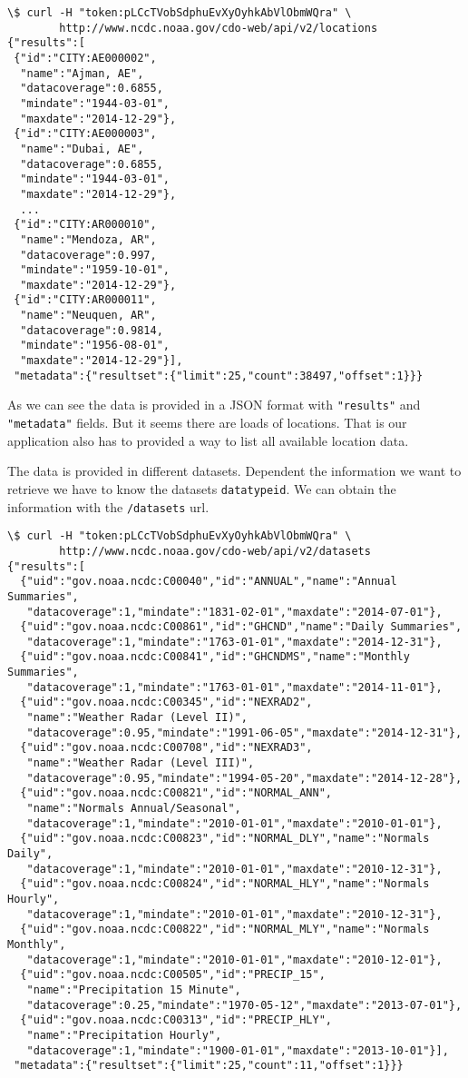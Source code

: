 \documentclass[10pt, a4paper]{article}
\begin{document}
\begin{verbatim}
\$ curl -H "token:pLCcTVobSdphuEvXyOyhkAbVlObmWQra" \
        http://www.ncdc.noaa.gov/cdo-web/api/v2/locations
{"results":[
 {"id":"CITY:AE000002",
  "name":"Ajman, AE",
  "datacoverage":0.6855,
  "mindate":"1944-03-01",
  "maxdate":"2014-12-29"},
 {"id":"CITY:AE000003",
  "name":"Dubai, AE",
  "datacoverage":0.6855,
  "mindate":"1944-03-01",
  "maxdate":"2014-12-29"},
  ...
 {"id":"CITY:AR000010",
  "name":"Mendoza, AR",
  "datacoverage":0.997,
  "mindate":"1959-10-01",
  "maxdate":"2014-12-29"},
 {"id":"CITY:AR000011",
  "name":"Neuquen, AR",
  "datacoverage":0.9814,
  "mindate":"1956-08-01",
  "maxdate":"2014-12-29"}],
 "metadata":{"resultset":{"limit":25,"count":38497,"offset":1}}}
\end{verbatim}

As we can see the data is provided in a JSON format with \texttt{"results"} and
\texttt{"metadata"} fields. But it seems there are loads of locations. That is
our application also has to provided a way to list all available location data.

The data is provided in different datasets. Dependent the information we want
to retrieve we have to know the datasets \texttt{datatypeid}. We can obtain the
information with the \texttt{/datasets} url.

\begin{verbatim}
\$ curl -H "token:pLCcTVobSdphuEvXyOyhkAbVlObmWQra" \
        http://www.ncdc.noaa.gov/cdo-web/api/v2/datasets
{"results":[
  {"uid":"gov.noaa.ncdc:C00040","id":"ANNUAL","name":"Annual Summaries",
   "datacoverage":1,"mindate":"1831-02-01","maxdate":"2014-07-01"},
  {"uid":"gov.noaa.ncdc:C00861","id":"GHCND","name":"Daily Summaries",
   "datacoverage":1,"mindate":"1763-01-01","maxdate":"2014-12-31"},
  {"uid":"gov.noaa.ncdc:C00841","id":"GHCNDMS","name":"Monthly Summaries",
   "datacoverage":1,"mindate":"1763-01-01","maxdate":"2014-11-01"},
  {"uid":"gov.noaa.ncdc:C00345","id":"NEXRAD2",
   "name":"Weather Radar (Level II)",
   "datacoverage":0.95,"mindate":"1991-06-05","maxdate":"2014-12-31"},
  {"uid":"gov.noaa.ncdc:C00708","id":"NEXRAD3",
   "name":"Weather Radar (Level III)",
   "datacoverage":0.95,"mindate":"1994-05-20","maxdate":"2014-12-28"},
  {"uid":"gov.noaa.ncdc:C00821","id":"NORMAL_ANN",
   "name":"Normals Annual/Seasonal",
   "datacoverage":1,"mindate":"2010-01-01","maxdate":"2010-01-01"},
  {"uid":"gov.noaa.ncdc:C00823","id":"NORMAL_DLY","name":"Normals Daily",
   "datacoverage":1,"mindate":"2010-01-01","maxdate":"2010-12-31"},
  {"uid":"gov.noaa.ncdc:C00824","id":"NORMAL_HLY","name":"Normals Hourly",
   "datacoverage":1,"mindate":"2010-01-01","maxdate":"2010-12-31"},
  {"uid":"gov.noaa.ncdc:C00822","id":"NORMAL_MLY","name":"Normals Monthly",
   "datacoverage":1,"mindate":"2010-01-01","maxdate":"2010-12-01"},
  {"uid":"gov.noaa.ncdc:C00505","id":"PRECIP_15",
   "name":"Precipitation 15 Minute",
   "datacoverage":0.25,"mindate":"1970-05-12","maxdate":"2013-07-01"},
  {"uid":"gov.noaa.ncdc:C00313","id":"PRECIP_HLY",
   "name":"Precipitation Hourly",
   "datacoverage":1,"mindate":"1900-01-01","maxdate":"2013-10-01"}],
 "metadata":{"resultset":{"limit":25,"count":11,"offset":1}}}
\end{verbatim}
\end{document}
